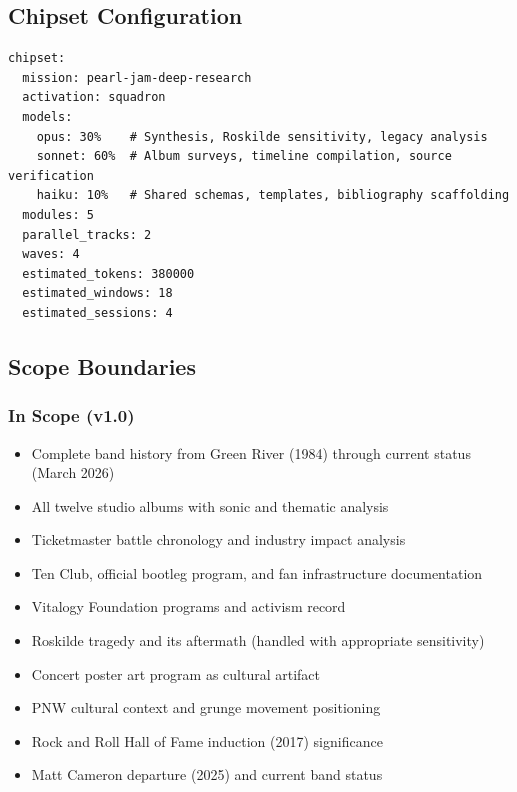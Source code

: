 \documentclass[11pt,letterpaper]{article}
\begin{document}
\subsection{Chipset Configuration}

\begin{asciibox}
\begin{verbatim}
chipset:
  mission: pearl-jam-deep-research
  activation: squadron
  models:
    opus: 30%    # Synthesis, Roskilde sensitivity, legacy analysis
    sonnet: 60%  # Album surveys, timeline compilation, source verification
    haiku: 10%   # Shared schemas, templates, bibliography scaffolding
  modules: 5
  parallel_tracks: 2
  waves: 4
  estimated_tokens: 380000
  estimated_windows: 18
  estimated_sessions: 4
\end{verbatim}
\end{asciibox}

\subsection{Scope Boundaries}

\subsubsection{In Scope (v1.0)}

\begin{itemize}[leftmargin=2em]
\item Complete band history from Green River (1984) through current status (March 2026)
\item All twelve studio albums with sonic and thematic analysis
\item Ticketmaster battle chronology and industry impact analysis
\item Ten Club, official bootleg program, and fan infrastructure documentation
\item Vitalogy Foundation programs and activism record
\item Roskilde tragedy and its aftermath (handled with appropriate sensitivity)
\item Concert poster art program as cultural artifact
\item PNW cultural context and grunge movement positioning
\item Rock and Roll Hall of Fame induction (2017) significance
\item Matt Cameron departure (2025) and current band status
\end{itemize}
\end{document}
